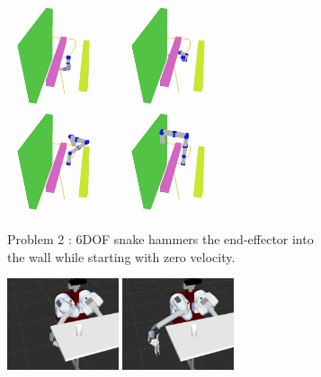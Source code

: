 \documentclass[letterpaper, 10 pt, conference]{ieeeconf}  %
\begin{document}
\begin{figure}[t!]
\begin{subfigure}[b]{\textwidth}
		\includegraphics[height=3cm]{fig/planning_efficiency/6dof_2}
		\includegraphics[height=3cm]{fig/planning_efficiency/6dof_3}
		\includegraphics[height=3cm]{fig/planning_efficiency/6dof_4}
		\includegraphics[height=3cm]{fig/planning_efficiency/6dof_5}
		\caption{\captionstyle Problem 2 : 6DOF snake hammers the end-effector into the wall while starting with zero velocity.}
		\vspace{6pt}
		\label{fig:planning_efficiency:6dof:example}
	\end{subfigure}
	\begin{subfigure}[b]{\textwidth}
    \centering
    \includegraphics[height=2.7cm]{fig/planning_efficiency/herb_batting_1}
    \includegraphics[height=2.7cm]{fig/planning_efficiency/herb_batting_2}

\end{subfigure}
\end{figure}
\end{document}
